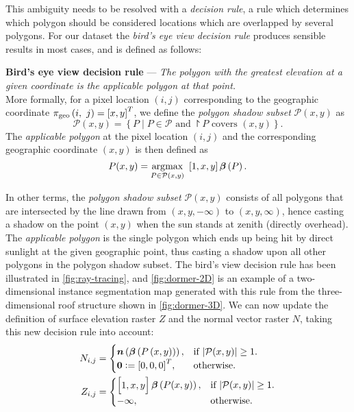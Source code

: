 This ambiguity needs to be resolved with a \textit{decision rule}, a rule which determines which polygon should be considered locations which are overlapped by several polygons.
For our dataset the \textit{bird's eye view decision rule} produces sensible results in most cases, and is defined as follows:
%
\begin{framed}
  \noindent
  \textbf{Bird's eye view decision rule}
  ---
  \textit{The polygon with the greatest elevation at a given coordinate is the applicable polygon at that point.}
  \\
  More formally, for a pixel location $(i, j)$ corresponding to the geographic coordinate $\pi_{\mathrm{geo}}\left(i,~j\right) = {[x, y]}^T$, we define the \textit{polygon shadow subset} $\mathcal{P}(x, y)$ as
  \begin{equation*}
    \mathcal{P}(x, y)
    =
    \left\{
      P
      \mid
      P \in \mathcal{P}
      \text{ and }
      \project{P} \text{ covers } (x, y)
    \right\}.
  \end{equation*}
  The \textit{applicable polygon} at the pixel location $(i, j)$ and the corresponding geographic coordinate $(x, y)$ is then defined as
  \begin{equation*}
    P(x, y)
    =
    \operatorname*{\arg\!\max}_{P \in \mathcal{P}(x, y)}~
    \left[1, x, y\right] \boldsymbol{\beta}\left(P\right).
  \end{equation*}
  \vspace{-1.5em}
\end{framed}
%
In other terms, the \textit{polygon shadow subset} $\mathcal{P}(x, y)$ consists of all polygons that are intersected by the line drawn from $(x, y, -\infty)$ to $(x, y, \infty)$, hence casting a shadow on the point $(x, y)$ when the sun stands at zenith (directly overhead).
The \textit{applicable polygon} is the single polygon which ends up being hit by direct sunlight at the given geographic point, thus casting a shadow upon all other polygons in the polygon shadow subset.
The bird's view decision rule has been illustrated in \cref{fig:ray-tracing}, and \cref{fig:dormer-2D} is an example of a two-dimensional instance segmentation map generated with this rule from the three-dimensional roof structure shown in \cref{fig:dormer-3D}.
We can now update the definition of surface elevation raster $Z$ and the normal vector raster $N$, taking this new decision rule into account:
\begin{align*}
  N_{i,j} &= \begin{cases}
    \boldsymbol{n}\left(\boldsymbol{\beta}\left(P\left(x, y\right)\right)\right), &\text{if $|\mathcal{P}(x,y)| \geq 1$}.\\
    \boldsymbol{0} \vcentcolon= {[0, 0, 0]}^T, &\text{otherwise.}
  \end{cases}
  \\
  Z_{i,j} &= \begin{cases}
    \begin{bmatrix}1, x, y\end{bmatrix} \boldsymbol{\beta}\left(P(x, y)\right), &\text{if } |\mathcal{P}(x,y)| \geq 1.\\
    -\infty, &\text{otherwise}.
  \end{cases}
\end{align*}

